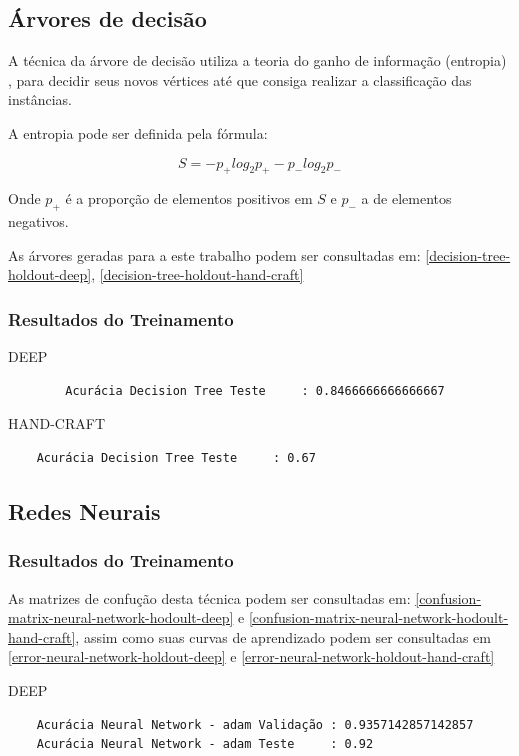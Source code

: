 \documentclass[
article,			%
11pt,				%
oneside,			%
a4paper,			%
english,			%
brazil,				%
sumario=tradicional,
]{abntex2}
\begin{document}
	\subsection{Árvores de decisão}
	
	A técnica da árvore de decisão utiliza a teoria do ganho de informação (entropia) , para decidir seus novos vértices até que consiga realizar a classificação das instâncias.
	
	A entropia pode ser definida pela fórmula:
	
	\begin{equation}
	S = -p_+ log_2 p_+-p_-log_2p_-
	\end{equation}
	
	Onde \(p_+\) é a proporção de elementos positivos em \(S\) e \(p_-\) a de elementos negativos.
	
	 As árvores geradas para a este trabalho podem ser consultadas em: \autoref{decision-tree-holdout-deep}, \autoref{decision-tree-holdout-hand-craft}
	
	\subsubsection{Resultados do Treinamento}
	DEEP
	\begin{verbatim}
		Acurácia Decision Tree Teste     : 0.8466666666666667
	\end{verbatim}
	
	HAND-CRAFT
	\begin{verbatim}
	Acurácia Decision Tree Teste     : 0.67
	\end{verbatim}
	
	\subsection{Redes Neurais}
	
	\subsubsection{Resultados do Treinamento}
	
	As matrizes de confução desta técnica podem ser consultadas em: \autoref{confusion-matrix-neural-network-hodoult-deep} e \autoref{confusion-matrix-neural-network-hodoult-hand-craft}, assim como suas curvas de aprendizado podem ser consultadas em \autoref{error-neural-network-holdout-deep} e \autoref{error-neural-network-holdout-hand-craft}
	
	DEEP
	\begin{verbatim}
	Acurácia Neural Network - adam Validação : 0.9357142857142857
	Acurácia Neural Network - adam Teste     : 0.92
	\end{verbatim}
	
\end{document}
